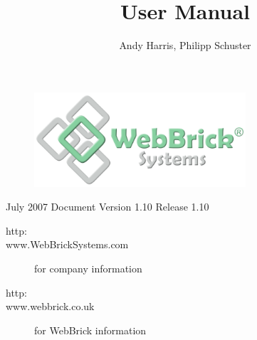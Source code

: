 \documentclass[a4paper,12pt]{article}
\title{\sf{WebBrick Gateway}\linebreak \linebreak User Manual}
\author{Andy Harris, Philipp Schuster}
\begin{document}
\maketitle

\begin{figure}[H]
\centering
\includegraphics[width=0.7\textwidth]{../../Images/WebBrickSystems.png}
\end{figure}


\begin{description}
\item[July 2007 Document Version 1.10 Release 1.10]
\end{description}

\begin{description}
\item[http:\\www.WebBrickSystems.com] for company information
\item[http:\\www.webbrick.co.uk] for WebBrick information
\end{description}

\pagebreak

\tableofcontents

\pagebreak








\end{document}
